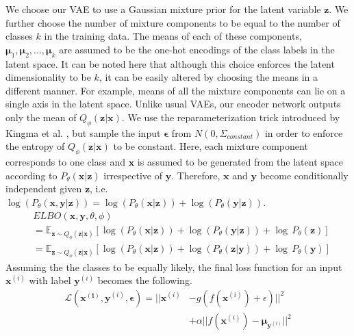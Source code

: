 \documentclass[letterpaper]{article} %
\begin{document}
We choose our VAE to use a Gaussian mixture prior for the latent variable $\mathbf{z}$. We further choose the number of mixture components to be equal to the number of classes $k$ in the training data. The means of each of these components, $\boldsymbol{\mu}_{1},\boldsymbol{\mu}_{2},...,\boldsymbol{\mu}_{k}$ are assumed to be the one-hot encodings of the class labels in the latent space. It can be noted here that although this choice enforces the latent dimensionality to be $k$, it can be easily altered by choosing the means in a different manner. For example, means of all the mixture components can lie on a single axis in the latent space. Unlike usual VAEs, our encoder network outputs only the mean of $Q_\phi(\mathbf{z}|\mathbf{x})$. We use the reparameterization trick introduced by Kingma et al. , but sample the input $\boldsymbol{\epsilon}$ from $N(0,\Sigma_{constant})$ in order to enforce the entropy of $Q_\phi(\mathbf{z}|\mathbf{x})$ to be constant. Here, each mixture component corresponds to one class and $\mathbf{x}$ is assumed to be generated from the latent space according to $P_{\theta}(\mathbf{x}|\mathbf{z})$ irrespective of $\mathbf{y}$. Therefore, $\mathbf{x}$ and $\mathbf{y}$ become conditionally independent given $\mathbf{z}$, i.e. $\log(P_{\theta}(\mathbf{x},\mathbf{y}|\mathbf{z})) = \log(P_{\theta}(\mathbf{x}|\mathbf{z})) + \log(P_{\theta}(\mathbf{y}|\mathbf{z}))$. 
\begin{equation}
\begin{split}
&ELBO(\mathbf{x},\mathbf{y},\theta,\phi) \\ &= \mathbb{E}_{\mathbf{z}\sim Q_{\phi}(\mathbf{z}|\mathbf{x})} \left[\log(P_{\theta}(\mathbf{x}|\mathbf{z})) + \log(P_{\theta}(\mathbf{y}|\mathbf{z})) + \log \, P_{\theta}(\mathbf{z}) \right] \\
&= \mathbb{E}_{\mathbf{z}\sim Q_{\phi}(\mathbf{z}|\mathbf{x})} \left[\log(P_{\theta}(\mathbf{x}|\mathbf{z})) + \log(P_{\theta}(\mathbf{z}|\mathbf{y})) + \log \, P_{\theta}(\mathbf{y}) \right]
\end{split}
\label{elbo_with_y}
\end{equation}
Assuming the the classes to be equally likely, the final loss function for an input $\mathbf{x}^{(i)}$ with label $\mathbf{y}^{(i)}$ becomes the following.
\begin{equation}
\begin{split}
\mathcal{L}(\mathbf{x^{(i)}}, \mathbf{y}^{(i)}, \boldsymbol{\epsilon}) = ||\mathbf{x}^{(i)} &- g(f(\mathbf{x}^{(i)})+\epsilon) ||^2 \\
&+ \alpha|| f(\mathbf{x}^{(i)}) - \boldsymbol{\mu}_{\mathbf{y}^{(i)}} ||^2 %
\end{split}
\label{final_loss}
\end{equation}
\end{document}

